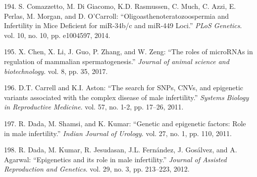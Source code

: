 \documentclass[12pt,twoside]{reedthesis}
\theoremstyle{definition}
\theoremstyle{definition}
\theoremstyle{remark}
\begin{document}
  \hypertarget{ref-Comazzetto2014}{}
  194. S. Comazzetto, M. Di Giacomo, K.D. Rasmussen, C. Much, C. Azzi, E.
  Perlas, M. Morgan, and D. O'Carroll: ``Oligoasthenoteratozoospermia and
  Infertility in Mice Deficient for miR-34b/c and miR-449 Loci.''
  \emph{PLoS Genetics}. vol. 10, no. 10, pp. e1004597, 2014.
  
  \hypertarget{ref-Chen2017}{}
  195. X. Chen, X. Li, J. Guo, P. Zhang, and W. Zeng: ``The roles of
  microRNAs in regulation of mammalian spermatogenesis.'' \emph{Journal of
  animal science and biotechnology}. vol. 8, pp. 35, 2017.
  
  \hypertarget{ref-Carrell2011}{}
  196. D.T. Carrell and K.I. Aston: ``The search for SNPs, CNVs, and
  epigenetic variants associated with the complex disease of male
  infertility.'' \emph{Systems Biology in Reproductive Medicine}. vol. 57,
  no. 1-2, pp. 17--26, 2011.
  
  \hypertarget{ref-Dada2011}{}
  197. R. Dada, M. Shamsi, and K. Kumar: ``Genetic and epigenetic factors:
  Role in male infertility.'' \emph{Indian Journal of Urology}. vol. 27,
  no. 1, pp. 110, 2011.
  
  \hypertarget{ref-Dada2012}{}
  198. R. Dada, M. Kumar, R. Jesudasan, J.L. Fernández, J. Gosálvez, and
  A. Agarwal: ``Epigenetics and its role in male infertility.''
  \emph{Journal of Assisted Reproduction and Genetics}. vol. 29, no. 3,
  pp. 213--223, 2012.


\end{document}
